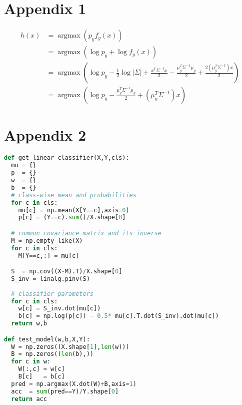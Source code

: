 \documentclass[12pt,crop=false,class=article,convert={density=300,outext=.compiled.png}]{standalone}
\begin{document}
\section*{Appendix 1}
\begin{align*}
  h(x) &= \operatorname{arg max} \left( p_yf_y(x) \right)
  \\
  &= \operatorname{arg max} \left( \log p_y + \log f_y(x)  \right)
  \\
  &= \operatorname{arg max} \left( \log p_y -\frac{1}{2} \log |\Sigma| + \frac{x^T\Sigma^{-1}x}{2} - \frac{\mu_y^T\Sigma^{-1}\mu_y}{2} + \frac{2(\mu_y^T\Sigma^{-1})x}{2}  \right)
  \\
  &= \operatorname{arg max} \left( \log p_y - \frac{\mu_y^T\Sigma^{-1}\mu_y}{2} + (\mu_y^T\Sigma^{-1})x  \right)
\end{align*}
\section*{Appendix 2}

\begin{lstlisting}[language=Python]
def get_linear_classifier(X,Y,cls):
  mu = {}
  p  = {}
  w  = {}
  b  = {}
  # class-wise mean and probabilities
  for c in cls:
    mu[c] = np.mean(X[Y==c],axis=0)
    p[c] = (Y==c).sum()/X.shape[0]

  # common covariance matrix and its inverse
  M = np.empty_like(X)
  for c in cls:
    M[Y==c,:] = mu[c]

  S  = np.cov((X-M).T)/X.shape[0] 
  S_inv = linalg.pinv(S)
  
  # classifier parameters
  for c in cls:
    w[c] = S_inv.dot(mu[c])
    b[c] = np.log(p[c]) - 0.5* mu[c].T.dot(S_inv).dot(mu[c]) 
  return w,b

def test_model(w,b,X,Y):
  W = np.zeros((X.shape[1],len(w)))
  B = np.zeros((len(b),))
  for c in w:
    W[:,c] = w[c]
    B[c]   = b[c]
  pred = np.argmax(X.dot(W)+B,axis=1) 
  acc  = sum(pred==Y)/Y.shape[0]
  return acc
\end{lstlisting}
\end{document}
